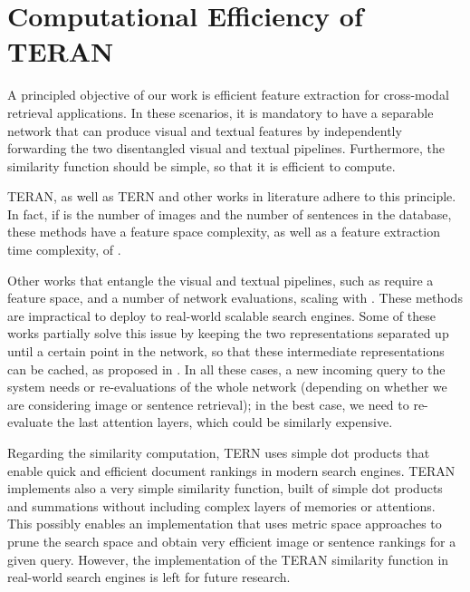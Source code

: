 \documentclass[acmsmall]{acmart}
\newcommand{\majorrevised}[1]{#1}
\begin{document}
\majorrevised{
\section{Computational Efficiency of TERAN}
\label{sec:computational_efficiency}
A principled objective of our work is efficient feature extraction for cross-modal retrieval applications. In these scenarios, it is mandatory to have a separable network that can produce visual and textual features by independently forwarding the two disentangled visual and textual pipelines. Furthermore, the similarity function should be simple, so that it is efficient to compute.

TERAN, as well as TERN \cite{messina2020tern} and other works in literature \cite{wu2019learning,qu2020context,li2019} adhere to this principle. In fact, if  is the number of images and  the number of sentences in the database, these methods have a feature space complexity, as well as a feature extraction time complexity, of .

Other works that entangle the visual and textual pipelines, such as \cite{Chen2020imram,xu2020cross,wang2019position} require a feature space, and a number of network evaluations, scaling with . These methods are impractical to deploy to real-world scalable search engines. Some of these works partially solve this issue by keeping the two representations separated up until a certain point in the network, so that these intermediate representations can be cached, as proposed in \cite{macavaney2020efficient}.
In all these cases, a new incoming query to the system needs  or  re-evaluations of the whole network (depending on whether we are considering image or sentence retrieval); in the best case, we need to re-evaluate the last attention layers, which could be similarly expensive.

Regarding the similarity computation, TERN uses simple dot products that enable quick and efficient document rankings in modern search engines.
TERAN implements also a very simple similarity function, built of simple dot products and summations without including complex layers of memories or attentions. This possibly enables an implementation that uses metric space approaches to prune the search space and obtain very efficient image or sentence rankings for a given query. However, the implementation of the TERAN similarity function in real-world search engines is left for future research.
}
\end{document}
